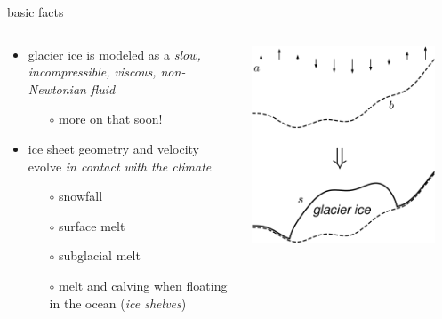 \documentclass[svgnames,
               hyperref={colorlinks,citecolor=DeepPink4,linkcolor=FireBrick,urlcolor=Maroon},
               usepdftitle=false]  %
               {beamer}
\begin{document}
\begin{frame}{basic facts}

\begin{columns}
\begin{column}{0.6\textwidth}
\begin{itemize}
\item glacier ice is modeled as a \emph{slow, incompressible, viscous, non-Newtonian fluid}
    \begin{itemize}
    \item[$\circ$] more on that soon!
    \end{itemize}
\item ice sheet geometry and velocity evolve \emph{in contact with the climate}
    \begin{itemize}
    \item[$\circ$] snowfall
    \item[$\circ$] surface melt
    \item[$\circ$] subglacial melt
    \item[$\circ$] melt and calving when floating in the ocean (\emph{ice shelves})
    \end{itemize}
\end{itemize}
\end{column}
\begin{column}{0.42\textwidth}
\hfill \includegraphics[width=0.9\textwidth]{images/map-glacier-ice.png}
\end{column}
\end{columns}
\end{frame}
\end{document}
